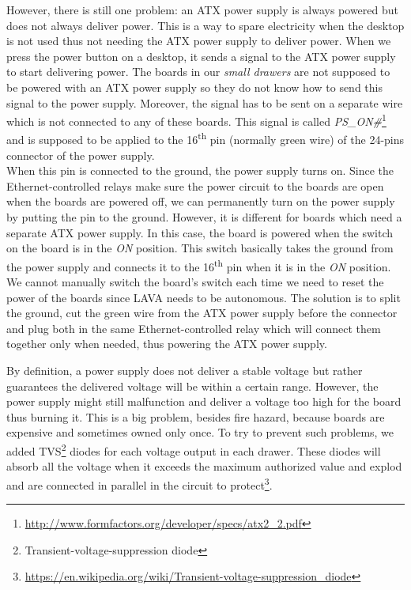 However, there is still one problem: an ATX power supply is always powered but does not always deliver power. This is a way to spare electricity when the desktop is not used thus not needing the ATX power supply to deliver power. When we press the power button on a desktop, it sends a signal to the ATX power supply to start delivering power. The boards in our \textit{small drawers} are not supposed to be powered with an ATX power supply so they do not know how to send this signal to the power supply. Moreover, the signal has to be sent on a separate wire which is not connected to any of these boards. This signal is called \textit{PS\_ON\#}\footnote{\url{http://www.formfactors.org/developer/specs/atx2\_2.pdf}} and is supposed to be applied to the 16\textsuperscript{th} pin (normally green wire) of the 24-pins connector of the power supply.\\
When this pin is connected to the ground, the power supply turns on. Since the Ethernet-controlled relays make sure the power circuit to the boards are open when the boards are powered off, we can permanently turn on the power supply by putting the pin to the ground. However, it is different for boards which need a separate ATX power supply. In this case, the board is powered when the switch on the board is in the \textit{ON} position. This switch basically takes the ground from the power supply and connects it to the 16\textsuperscript{th} pin when it is in the \textit{ON} position. We cannot manually switch the board's switch each time we need to reset the power of the boards since LAVA needs to be autonomous. The solution is to split the ground, cut the green wire from the ATX power supply before the connector and plug both in the same Ethernet-controlled relay which will connect them together only when needed, thus powering the ATX power supply.

By definition, a power supply does not deliver a stable voltage but rather guarantees the delivered voltage will be within a certain range. However, the power supply might still malfunction and deliver a voltage too high for the board thus burning it. This is a big problem, besides fire hazard, because boards are expensive and sometimes owned only once. To try to prevent such problems, we added TVS\footnote{Transient-voltage-suppression diode} diodes for each voltage output in each drawer. These diodes will absorb all the voltage when it exceeds the maximum authorized value and explod and are connected in parallel in the circuit to protect\footnote{\url{https://en.wikipedia.org/wiki/Transient-voltage-suppression\_diode}}.

